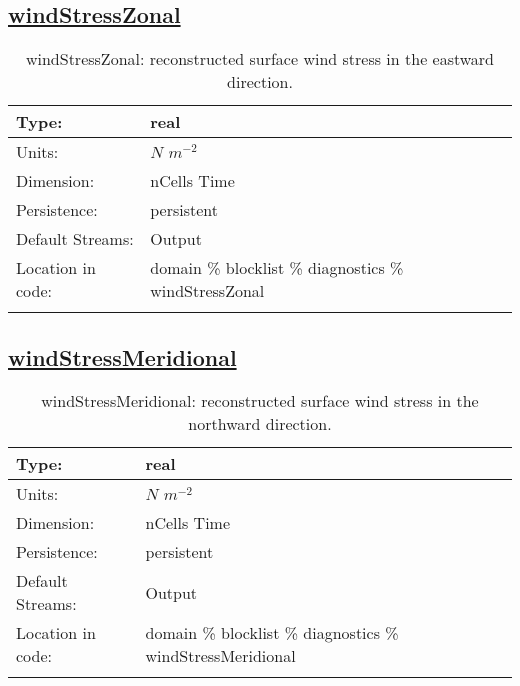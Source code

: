 \subsection[windStressZonal]{\hyperref[sec:var_tab_diagnostics]{windStressZonal}}
\label{subsec:var_sec_diagnostics_windStressZonal}
\begin{center}
\begin{longtable}{| p{2.0in} | p{4.0in} |}
        \hline 
        Type: & real \\
        \hline 
        Units: & $N$ $m^{-2}$ \\
        \hline 
        Dimension: & nCells Time \\
        \hline 
        Persistence: & persistent \\
        \hline 
		 Default Streams: & Output  \\
        \hline 
		 Location in code: & domain \% blocklist \% diagnostics \% windStressZonal \\
		 \hline 
    \caption{windStressZonal: reconstructed surface wind stress in the eastward direction.}
\end{longtable}
\end{center}
\subsection[windStressMeridional]{\hyperref[sec:var_tab_diagnostics]{windStressMeridional}}
\label{subsec:var_sec_diagnostics_windStressMeridional}
\begin{center}
\begin{longtable}{| p{2.0in} | p{4.0in} |}
        \hline 
        Type: & real \\
        \hline 
        Units: & $N$ $m^{-2}$ \\
        \hline 
        Dimension: & nCells Time \\
        \hline 
        Persistence: & persistent \\
        \hline 
		 Default Streams: & Output  \\
        \hline 
		 Location in code: & domain \% blocklist \% diagnostics \% windStressMeridional \\
		 \hline 
    \caption{windStressMeridional: reconstructed surface wind stress in the northward direction.}
\end{longtable}
\end{center}
